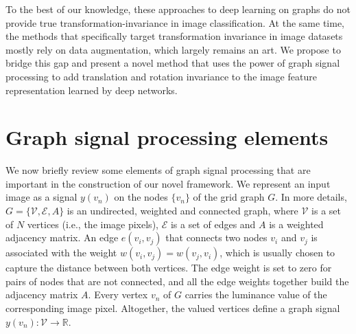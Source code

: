 \documentclass[10pt,journal,compsoc]{IEEEtran}
\begin{document}
	To the best of our knowledge, these approaches to deep learning on graphs do not provide true transformation-invariance in image classification. At the same time, the methods that specifically target transformation invariance in image datasets mostly rely on data augmentation, which largely remains an art. We propose to bridge this gap and present a novel method that uses the power of graph signal processing to add translation and rotation invariance to the image feature representation learned by deep networks.





	\section{Graph signal processing elements}
	\label{s:gsp}

	We now briefly review some elements of graph signal processing that are important in the construction of our novel framework. We represent an input image as a signal $y(v_n)$ on the nodes $\{v_n\}$ of the grid graph $G$. In more details, $G=\{{\mathcal{V},\mathcal{E}}, A\}$ is an undirected, weighted and connected graph, where $\mathcal{V}$ is a set of $N$ vertices (i.e., the image pixels), $\mathcal{E}$ is a set of edges and $A$ is a weighted adjacency matrix. An edge $e(v_i,v_j)$ that connects two nodes $v_i$ and $v_j$ is associated with the weight $w(v_i, v_j)=w(v_j, v_i)$, which is usually chosen to capture the distance between both vertices. The edge weight is set to zero for pairs of nodes that are not connected, and all the edge weights together build the adjacency matrix $A$. Every vertex $v_n$ of $G$ carries the luminance value of the corresponding image pixel. Altogether, the valued vertices define a graph signal $y(v_n): \mathcal{V} \to \mathbb{R}$.
\end{document}
